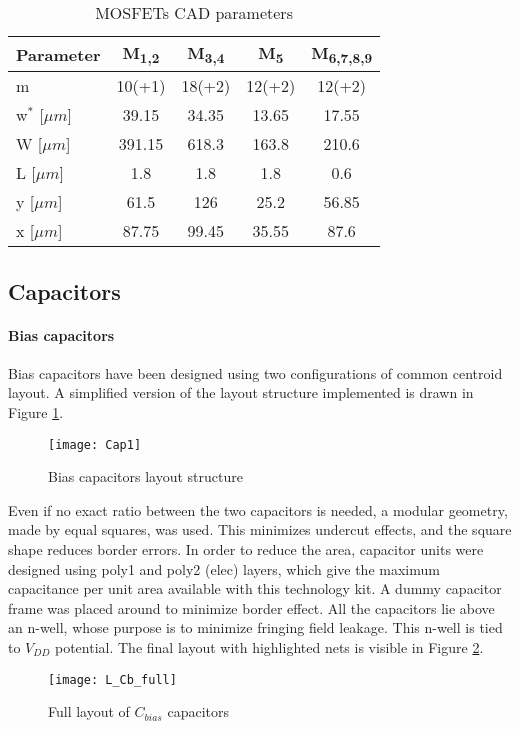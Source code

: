 \begin{table} [h]
	\label{tab:specs}
	\caption{MOSFETs CAD parameters}
	\centering	
	\begin{tabular}{lcccc} 
		\toprule 
		Parameter & M\textsubscript{1,2}& M\textsubscript{3,4} & M\textsubscript{5}&M\textsubscript{6,7,8,9} \\ 
		\midrule
		m				&10(+1)	&18(+2)	&12(+2)	&12(+2)\\
		w$^*$ [$\mu m$] &39.15	&34.35	&13.65	&17.55\\
		W [$\mu m$]		&391.15	&618.3	&163.8	&210.6 \\
		L [$\mu m$] 	&1.8 	&1.8 	&1.8 	& 0.6 \\
		y [$\mu m$] 	&61.5	&126	&25.2	&56.85\\
		x [$\mu m$] 	&87.75	&99.45	&35.55	&87.6\\
		\bottomrule 
	\end{tabular}	
\end{table}

\subsection{Capacitors}
\paragraph{Bias capacitors}
Bias capacitors have been designed using two configurations of common centroid layout.
A simplified version of the layout structure implemented is drawn in Figure \ref{Cap1}. 
\begin{figure}[H]
	\centering
	\texttt{[image: Cap1]}
	\caption{Bias capacitors layout structure}
	\label{Cap1}
\end{figure}
Even if no exact ratio between the two capacitors is needed, a modular geometry, made by equal squares, was used. This minimizes undercut effects, and the square shape reduces border errors. In order to reduce the area, capacitor units were designed using poly1 and poly2 (elec) layers, which give the maximum capacitance per unit area available with this technology kit. A dummy capacitor frame was placed around to minimize border effect. All the capacitors lie above an n-well, whose purpose is to minimize fringing field leakage. This n-well is tied to \(V_{DD}\) potential. The final layout with highlighted nets is visible in Figure \ref{L_Cb_full}.
\begin{figure}[H]
	\centering
	\texttt{[image: L\_Cb\_full]}
	\caption{Full layout of \(C_{bias}\) capacitors}
	\label{L_Cb_full}
\end{figure}

